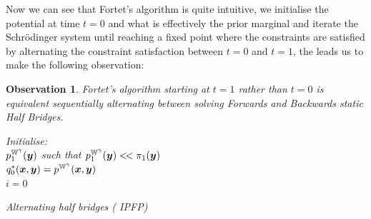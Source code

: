 \documentclass[a4paper,12pt,twoside,openright]{report}
\newtheorem{observation}[theorem]{Observation}
\theoremstyle{definition}
\begin{document}
Now we can see that Fortet's algorithm is quite intuitive, we initialise the potential at time $t=0$ and what is effectively the prior marginal and iterate the Schrödinger system until reaching a fixed point where the constraints are satisfied by alternating the constraint satisfaction between $t=0$ and $t=1$, the leads us to make the following observation:
\begin{observation}
Fortet's algorithm starting at $t=1$ rather than $t=0$ is equivalent sequentially alternating between solving  Forwards and Backwards static Half Bridges.
\begin{algorithm} \label{alg:ipfp_intro}
Initialise:\\
$p^{\mathbb{W}^{\gamma}}_1({\bm{y}})$ such that $p^{\mathbb{W}^{\gamma}}_1({\bm{y}}) <\!< \pi_1({\bm{y}})$ \\
$ q^{*}_{0}({\bm{x}},{\bm{y}}) =p^{\mathbb{W}^{\gamma}}({\bm{x}},{\bm{y}})$\\
$i=0$ \\
\caption{Alternating half bridges (\cite{kullback1968probability} IPFP) }
\end{algorithm}
\end{observation}
\end{document}

